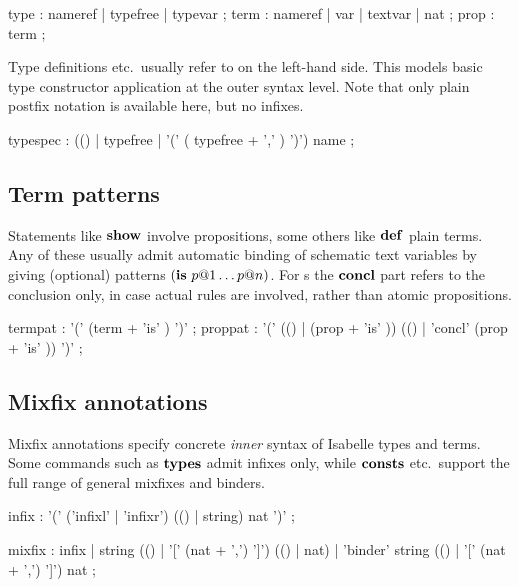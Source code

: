 \begin{rail}
  type : nameref | typefree | typevar
  ;
  term : nameref | var | textvar | nat
  ;
  prop : term
  ;
\end{rail}

Type definitions etc.\ usually refer to  on the
left-hand side.  This models basic type constructor application at the outer
syntax level.  Note that only plain postfix notation is available here, but no
infixes.

\begin{rail}
  typespec : (() | typefree | '(' ( typefree + ',' ) ')') name
  ;
\end{rail}


\subsection{Term patterns}

Statements like ${\mathord{\mathbf{show}}}$ involve propositions, some others like ${\mathord{\mathbf{def}}}$
plain terms.  Any of these usually admit automatic binding of schematic text
variables by giving (optional) patterns $({\mathord{\mathbf{is}}}~p@1 \dots p@n)$.  For
s the ${\mathord{\mathbf{concl}}}$ part refers to the conclusion only, in case
actual rules are involved, rather than atomic propositions.

\begin{rail}
  termpat : '(' (term + 'is' ) ')'
  ;
  proppat : '(' (() | (prop + 'is' )) (() | 'concl' (prop + 'is' )) ')'
  ;
\end{rail}


\subsection{Mixfix annotations}

Mixfix annotations specify concrete \emph{inner} syntax of Isabelle types and
terms.  Some commands such as ${\mathord{\mathbf{types}}}$ admit infixes only, while ${\mathord{\mathbf{consts}}}$
etc.\ support the full range of general mixfixes and binders.

\begin{rail}
  infix : '(' ('infixl' | 'infixr') (() | string) nat ')'
  ;

  mixfix : infix | string (() | '[' (nat + ',') ']') (() | nat) |
  'binder' string (() | '[' (nat + ',') ']') nat
  ;
\end{rail}


